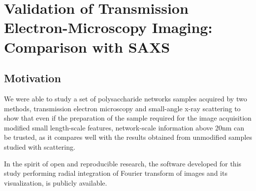 
\chapter{Validation of Transmission Electron-Microscopy Imaging: Comparison with SAXS}

\label{Chapter-TEMSAXS} %


\section{Motivation}

We were able to study a set of polysaccharide networks samples acquired by two methods,
transmission electron microscopy and small-angle x-ray scattering to show that even
if the preparation of the sample required for the image acquisition modified small length-scale features,
network-scale information above 20nm can be trusted, as it compares well with the results obtained from
unmodified samples studied with scattering.

In the spirit of open and reproducible research, the software developed for this study performing radial integration of Fourier transform of images and its visualization, is publicly available.


